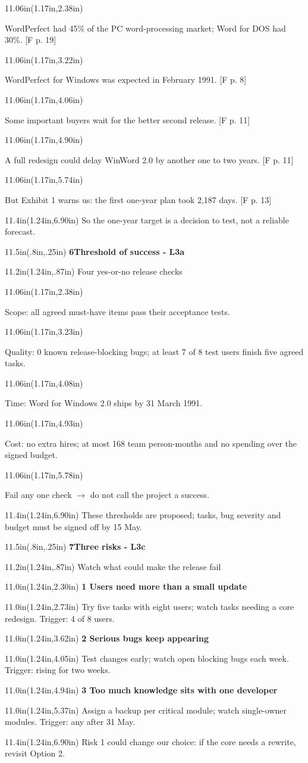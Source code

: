 \documentclass{article}
\newcommand{\Place}[5]{%
  \begin{textblock*}{#3in}(#1in,#2in)%
    {\color{#5}#4}%
  \end{textblock*}%
}
\newcommand{\SlideHeading}[3]{%
  \Place{.8}{.25}{11.5}{\fontsize{12}{14}\selectfont\bfseries #1\quad #2}{muted}%
  \Place{1.24}{.87}{11.2}{\fontsize{30}{32}\selectfont\color{ink}#3}{ink}%
}
\newcommand{\Item}[3]{%
  \Place{1.17}{#1}{11.06}{\fontsize{#2}{23.8}\selectfont\raggedright\textbullet\enspace #3}{ink}%
}
\newcommand{\Foot}[1]{%
  \Place{1.24}{6.90}{11.4}{\fontsize{12.4}{15}\selectfont #1}{muted}%
}
\newcommand{\RiskHead}[2]{%
  \Place{1.24}{#1}{11.0}{\fontsize{19.4}{23}\selectfont\bfseries #2}{ink}%
}
\newcommand{\RiskBody}[2]{%
  \Place{1.24}{#1}{11.0}{\fontsize{17.35}{21}\selectfont #2}{muted}%
}
\begin{document}
\Item{2.38}{19.1}{WordPerfect had 45\% of the PC word-processing market; Word for DOS had 30\%. [F p. 19]}
\Item{3.22}{19.1}{WordPerfect for Windows was expected in February 1991. [F p. 8]}
\Item{4.06}{19.1}{Some important buyers wait for the better second release. [F p. 11]}
\Item{4.90}{19.1}{A full redesign could delay WinWord 2.0 by another one to two years. [F p. 11]}
\Item{5.74}{19.1}{But Exhibit 1 warns us: the first one-year plan took 2,187 days. [F p. 13]}
\Foot{So the one-year target is a decision to test, not a reliable forecast.}
\newpage
\null
\SlideHeading{6}{Threshold of success - L3a}{Four yes-or-no release checks}
\Item{2.38}{19.1}{Scope: all agreed must-have items pass their acceptance tests.}
\Item{3.23}{19.1}{Quality: 0 known release-blocking bugs; at least 7 of 8 test users finish five agreed tasks.}
\Item{4.08}{19.1}{Time: Word for Windows 2.0 ships by 31 March 1991.}
\Item{4.93}{19.1}{Cost: no extra hires; at most 168 team person-months and no spending over the signed budget.}
\Item{5.78}{19.1}{Fail any one check $\rightarrow$ do not call the project a success.}
\Foot{These thresholds are proposed; tasks, bug severity and budget must be signed off by 15 May.}
\newpage
\null
\SlideHeading{7}{Three risks - L3c}{Watch what could make the release fail}
\RiskHead{2.30}{1 \quad Users need more than a small update \quad [Boehm \#3--4]}
\RiskBody{2.73}{Try five tasks with eight users; watch tasks needing a core redesign. Trigger: 4 of 8 users.}
\RiskHead{3.62}{2 \quad Serious bugs keep appearing \quad [Boehm \#2]}
\RiskBody{4.05}{Test changes early; watch open blocking bugs each week. Trigger: rising for two weeks.}
\RiskHead{4.94}{3 \quad Too much knowledge sits with one developer \quad [Boehm \#1]}
\RiskBody{5.37}{Assign a backup per critical module; watch single-owner modules. Trigger: any after 31 May.}
\Foot{Risk 1 could change our choice: if the core needs a rewrite, revisit Option 2.}
\end{document}
